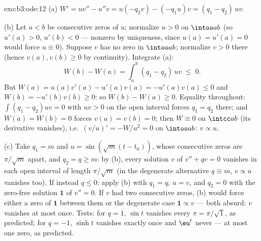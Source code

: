 \begin{solution}{exo:b3:ode:12}
(a) $W' = uv'' - u''v = u(-q_2v) - (-q_1u)v = (q_1 -
q_2)\,uv$.

(b) Let $a < b$ be consecutive zeros of $u$; normalize $u >
0$ on $\intoo ab$ (so $u'(a) > 0$, $u'(b) < 0$ --- nonzero
by uniqueness, since $u(a) = u'(a) = 0$ would force $u
\equiv 0$). Suppose $v$ has no zero in $\intoo ab$;
normalize $v > 0$ there (hence $v(a), v(b) \geq 0$ by
continuity). Integrate (a):
\[
W(b) - W(a) = \int_a^b(q_1 - q_2)\,uv \;\leq\; 0 .
\]
But $W(a) = u(a)v'(a) - u'(a)v(a) = -u'(a)v(a) \leq 0$ and
$W(b) = -u'(b)v(b) \geq 0$: so $W(b) - W(a) \geq 0$.
Equality throughout: $\int(q_1 - q_2)uv = 0$ with $uv > 0$
on the open interval forces $q_1 = q_2$ there; and $W(a) =
W(b) = 0$ forces $v(a) = v(b) = 0$; then $W \equiv 0$ on
$\intcc ab$ (its derivative vanishes), i.e.\
$(v/u)' = -W/u^2 = 0$ on $\intoo ab$: $v \propto u$.

(c) Take $q_1 = m$ and $u = \sin(\sqrt m(t - t_0))$, whose
consecutive zeros are $\pi/\sqrt m$ apart, and $q_2 = q \geq
m$: by (b), every solution $v$ of $v'' + qv = 0$ vanishes in
each open interval of length $\pi/\sqrt m$ (in the
degenerate alternative $q \equiv m$, $v \propto u$ vanishes
too). If instead $q \leq 0$: apply (b) with $q_1 = q$, $u =
v$, and $q_2 = 0$ with the zero-free solution $\mathbf 1$ of
$v'' = 0$. If $v$ had two consecutive zeros, (b) would force
either a zero of $\mathbf 1$ between them or the degenerate
case $\mathbf 1 \propto v$ --- both absurd: $v$ vanishes at
most once. Tests: for $q = 1$, $\sin t$ vanishes every $\pi
= \pi/\sqrt1$, as predicted; for $q = -1$, $\sinh t$
vanishes exactly once and $\eu^t$ never --- at most one
zero, as predicted.
\end{solution}

